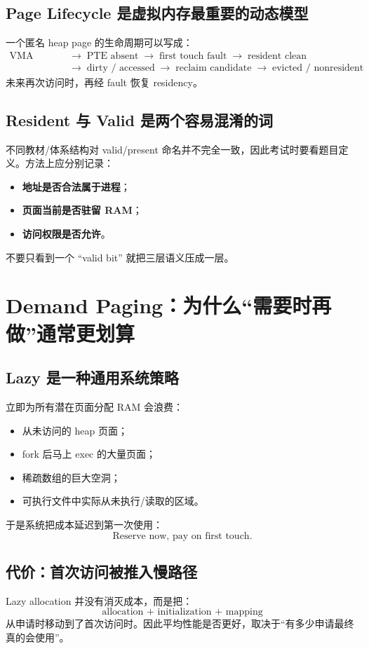 \documentclass[11pt,a4paper]{ctexart}
\newcommand{\kw}[1]{\textbf{#1}}
\newcommand{\arr}{\;\longrightarrow\;}
\begin{document}
\subsection{Page Lifecycle 是虚拟内存最重要的动态模型}
一个匿名 heap page 的生命周期可以写成：
\[
\boxed{
\begin{aligned}
\text{VMA exists} &\arr \text{PTE absent} \arr \text{first touch fault} \arr \text{resident clean} \\
&\arr \text{dirty / accessed} \arr \text{reclaim candidate} \arr \text{evicted / nonresident}
\end{aligned}
}
\]
未来再次访问时，再经 fault 恢复 residency。

\subsection{Resident 与 Valid 是两个容易混淆的词}
不同教材/体系结构对 valid/present 命名并不完全一致，因此考试时要看题目定义。方法上应分别记录：
\begin{itemize}
  \item \kw{地址是否合法属于进程}；
  \item \kw{页面当前是否驻留 RAM}；
  \item \kw{访问权限是否允许}。
\end{itemize}
不要只看到一个 ``valid bit'' 就把三层语义压成一层。

\section{Demand Paging：为什么“需要时再做”通常更划算}

\subsection{Lazy 是一种通用系统策略}
立即为所有潜在页面分配 RAM 会浪费：
\begin{itemize}
  \item 从未访问的 heap 页面；
  \item fork 后马上 exec 的大量页面；
  \item 稀疏数组的巨大空洞；
  \item 可执行文件中实际从未执行/读取的区域。
\end{itemize}
于是系统把成本延迟到第一次使用：
\[
\boxed{\text{Reserve now, pay on first touch.}}
\]

\subsection{代价：首次访问被推入慢路径}
Lazy allocation 并没有消灭成本，而是把：
\[
\text{allocation + initialization + mapping}
\]
从申请时移动到了首次访问时。因此平均性能是否更好，取决于“有多少申请最终真的会使用”。
\end{document}
